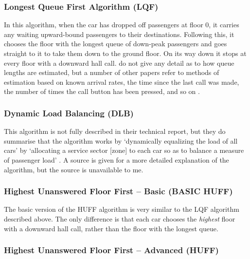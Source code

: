 \documentclass{UoYCSproject}
\begin{document}
\subsubsection{Longest Queue First Algorithm (LQF) \citep{Bao1994}}

In this algorithm, when the car has dropped off passengers at floor 0, it carries any waiting upward-bound passengers to their destinations.  Following this, it chooses the floor with the longest queue of down-peak passengers and goes straight to it to take them down to the ground floor.  On its way down it stops at every floor with a downward hall call.  \citet{Bao1994} do not give any detail as to how queue lengths are estimated, but a number of other papers refer to methods of estimation based on known arrival rates, the time since the last call was made, the number of times the call button has been pressed, and so on \citep{Crites1996, Crites1998, Thangavelu1989Patent, Pepyne1997, Nikovski2003}.

\subsubsection{Dynamic Load Balancing (DLB) \citep{Bao1994}}

This algorithm is not fully described in their technical report, but they do summarise that the algorithm works by `dynamically equalizing the load of all cars' by `allocating a service sector [zone] to each car so as to balance a measure of passenger load' \citep{Bao1994}.  A source is given for a more detailed explanation of the algorithm, but the source is unavailable to me.

\subsubsection{Highest Unanswered Floor First -- Basic (BASIC HUFF) \citep{Bao1994}}

The basic version of the HUFF algorithm is very similar to the LQF algorithm described above.  The only difference is that each car chooses the \textit{highest} floor with a downward hall call, rather than the floor with the longest queue.

\subsubsection{Highest Unanswered Floor First -- Advanced (HUFF) \citep{Bao1994}}
\end{document}
